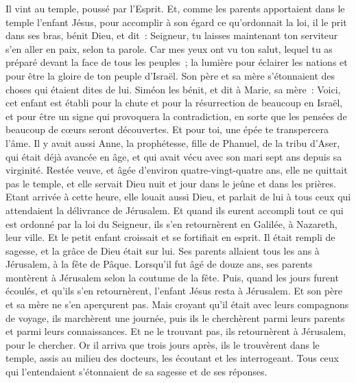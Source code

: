 \begin{multicols}{2}
Il vint au temple, poussé par l'Esprit. Et, comme les parents apportaient dans le temple l'enfant Jésus, pour accomplir à son égard ce qu'ordonnait la loi,
il le prit dans ses bras, bénit Dieu, et dit~:
Seigneur, tu laisses maintenant ton serviteur s'en aller en paix, selon ta parole.
Car mes yeux ont vu ton salut,
lequel tu as préparé devant la face de tous les peuples~;
la lumière pour éclairer les nations et pour être la gloire de ton peuple d'Israël.
Son père et sa mère s'étonnaient des choses qui étaient dites de lui.
Siméon les bénit, et dit à Marie, sa mère~: Voici, cet enfant est établi pour la chute et pour la résurrection de beaucoup en Israël, et pour être un signe qui provoquera la contradiction,
en sorte que les pensées de beaucoup de cœurs seront découvertes. Et pour toi, une épée te transpercera l'âme.
Il y avait aussi Anne, la prophétesse, fille de Phanuel, de la tribu d'Aser, qui était déjà avancée en âge, et qui avait vécu avec son mari sept ans depuis sa virginité.
Restée veuve, et âgée d'environ quatre-vingt-quatre ans, elle ne quittait pas le temple, et elle servait Dieu nuit et jour dans le jeûne et dans les prières.
Etant arrivée à cette heure, elle louait aussi Dieu, et parlait de lui à tous ceux qui attendaient la délivrance de Jérusalem.
Et quand ils eurent accompli tout ce qui est ordonné par la loi du Seigneur, ils s'en retournèrent en Galilée, à Nazareth, leur ville.
Et le petit enfant croissait et se fortifiait en esprit. Il était rempli de sagesse, et la grâce de Dieu était sur lui.
Ses parents allaient tous les ans à Jérusalem, à la fête de Pâque.
Lorsqu'il fut âgé de douze ans, ses parents montèrent à Jérusalem selon la coutume de la fête.
Puis, quand les jours furent écoulés, et qu'ils s'en retournèrent, l'enfant Jésus resta à Jérusalem. Et son père et sa mère ne s'en aperçurent pas.
Mais croyant qu'il était avec leurs compagnons de voyage, ils marchèrent une journée, puis ils le cherchèrent parmi leurs parents et parmi leurs connaissances.
Et ne le trouvant pas, ils retournèrent à Jérusalem, pour le chercher.
Or il arriva que trois jours après, ils le trouvèrent dans le temple, assis au milieu des docteurs, les écoutant et les interrogeant.
Tous ceux qui l'entendaient s'étonnaient de sa sagesse et de ses réponses.

\end{multicols}
